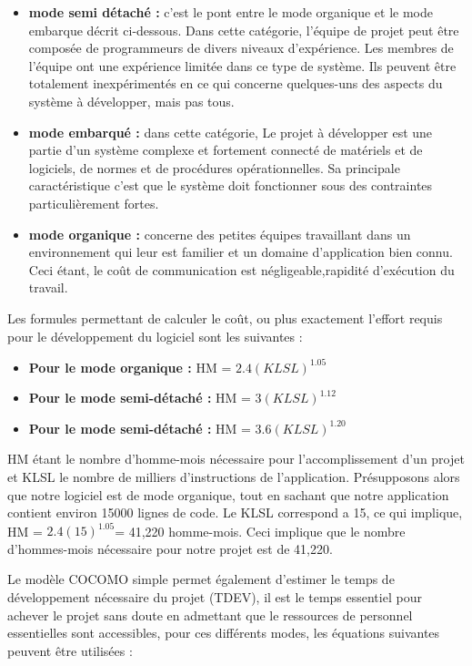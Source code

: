 {{\begin{itemize}[label=\textbullet, font=\LARGE \color{blue}] 
	\item \textbf{mode semi détaché :} c’est le pont entre le mode organique et le mode embarque décrit ci-dessous. Dans cette catégorie, l’équipe de projet peut être composée de programmeurs de divers niveaux d’expérience. Les membres de l’équipe ont une expérience limitée dans ce type de système. Ils peuvent être totalement inexpérimentés en ce qui concerne quelques-uns des aspects du système à développer, mais pas tous. 
	\item \textbf{mode embarqué :} dans cette catégorie, Le projet à développer est une partie d’un système complexe et fortement connecté de matériels et de logiciels, de normes et de procédures opérationnelles. Sa principale caractéristique c’est que le système doit fonctionner sous des contraintes particulièrement fortes.
	\item \textbf{mode organique :} concerne des petites équipes travaillant dans un environnement qui leur est familier et un domaine d’application bien connu. Ceci étant, le coût de communication est négligeable,rapidité d’exécution du travail. 

\end{itemize}

Les formules permettant de calculer le coût, ou plus exactement l’effort requis pour le développement du logiciel sont les suivantes : 

\begin{itemize}[label=\textbullet, font=\LARGE \color{blue}] 
	\item \textbf{Pour le mode organique  :} HM = $2.4(KLSL)^{1.05}$
	\item \textbf{Pour le mode semi-détaché :} HM = $3(KLSL)^{1.12}$
	\item \textbf{Pour le mode semi-détaché :} HM = $3.6(KLSL)^{1.20}$
\end{itemize}

HM étant le nombre d’homme-mois nécessaire pour l’accomplissement d’un projet et KLSL le nombre de milliers d’instructions de l’application. Présupposons alors que notre logiciel est de mode organique, tout en sachant que notre application contient environ 15000 lignes de code. 
Le KLSL correspond a 15, ce qui implique, HM = $2.4(15)^{1.05}$= 41,220 homme-mois. Ceci implique que le nombre d’hommes-mois nécessaire pour notre projet est de 41,220. 

Le modèle COCOMO simple permet également d’estimer le temps de développement nécessaire du projet (TDEV), il est le temps essentiel pour achever le projet sans doute en admettant que le ressources de personnel essentielles sont accessibles, pour ces différents modes, les équations suivantes peuvent être utilisées :

}}
